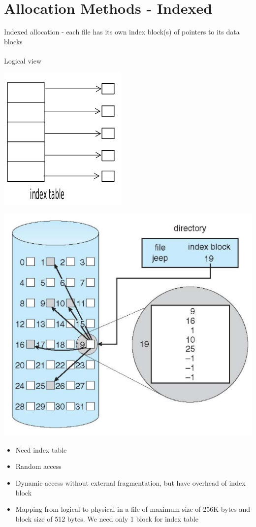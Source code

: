 \documentclass{article}[18pt]
\begin{document}
\section{Allocation Methods - Indexed}
Indexed allocation - each file has its own index block(s) of pointers to its data blocks\\
\\
Logical view
\begin{center}
	\includegraphics[scale=0.7]{index}
\end{center}
\begin{center}
	\includegraphics[scale=0.7]{index1}
\end{center}
\begin{itemize}
	\item Need index table
	\item Random access
	\item Dynamic access without external fragmentation, but have overhead of index block
	\item Mapping from logical to physical in a file of maximum size of 256K bytes and block size of 512 bytes. We need only 1 block for index table
\end{itemize}
\end{document}
